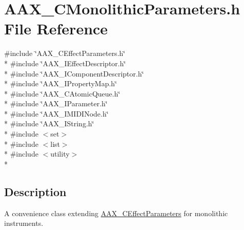 \hypertarget{a00178}{}\section{A\+A\+X\+\_\+\+C\+Monolithic\+Parameters.\+h File Reference}
\label{a00178}
{\ttfamily \#include \char`\"{}A\+A\+X\+\_\+\+C\+Effect\+Parameters.\+h\char`\"{}}\\*
{\ttfamily \#include \char`\"{}A\+A\+X\+\_\+\+I\+Effect\+Descriptor.\+h\char`\"{}}\\*
{\ttfamily \#include \char`\"{}A\+A\+X\+\_\+\+I\+Component\+Descriptor.\+h\char`\"{}}\\*
{\ttfamily \#include \char`\"{}A\+A\+X\+\_\+\+I\+Property\+Map.\+h\char`\"{}}\\*
{\ttfamily \#include \char`\"{}A\+A\+X\+\_\+\+C\+Atomic\+Queue.\+h\char`\"{}}\\*
{\ttfamily \#include \char`\"{}A\+A\+X\+\_\+\+I\+Parameter.\+h\char`\"{}}\\*
{\ttfamily \#include \char`\"{}A\+A\+X\+\_\+\+I\+M\+I\+D\+I\+Node.\+h\char`\"{}}\\*
{\ttfamily \#include \char`\"{}A\+A\+X\+\_\+\+I\+String.\+h\char`\"{}}\\*
{\ttfamily \#include $<$set$>$}\\*
{\ttfamily \#include $<$list$>$}\\*
{\ttfamily \#include $<$utility$>$}\\*


\subsection{Description}
A convenience class extending \hyperlink{a00018}{A\+A\+X\+\_\+\+C\+Effect\+Parameters} for monolithic instruments. 

